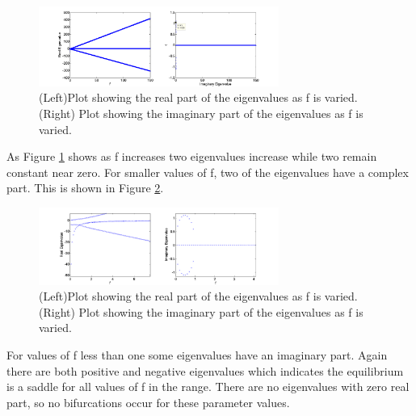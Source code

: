 \begin{figure}[H]
\centering
\includegraphics[width=0.7\textwidth]{f_Eigenvalues.png}
\caption{\label{fig:f_Eig}(Left)Plot showing the real part of the eigenvalues as f is varied. (Right) Plot showing the imaginary part of the eigenvalues as f is varied.
}
\end{figure}
As Figure \ref{fig:f_Eig} shows as f increases two eigenvalues increase while two remain constant near zero. For smaller values of f, two of the eigenvalues have a complex part. This is shown in Figure \ref{fig:f_Eig2}.

\begin{figure}[H]
\centering
\includegraphics[width=0.7\textwidth]{f_Eigenvalues2.png}
\caption{\label{fig:f_Eig2}(Left)Plot showing the real part of the eigenvalues as f is varied. (Right) Plot showing the imaginary part of the eigenvalues as f is varied.
}
\end{figure}
For values of f less than one some eigenvalues have an imaginary part. %
Again there are both positive and negative eigenvalues which indicates the equilibrium is a saddle for all values of f in the range. There are no eigenvalues with zero real part, so no bifurcations occur for these parameter values. 




